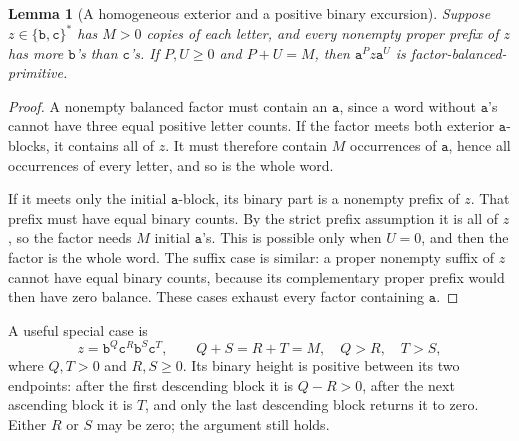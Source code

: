 \documentclass[11pt,letterpaper]{article}
\numberwithin{equation}{section}
\newtheorem{lemma}[theorem]{Lemma}
\theoremstyle{definition}
\theoremstyle{remark}
\renewcommand{\aa}{\mathtt a}
\newcommand{\bb}{\mathtt b}
\newcommand{\cc}{\mathtt c}
\begin{document}
\begin{lemma}[A homogeneous exterior and a positive binary excursion]
\label{lem:primitive}
Suppose \(z\in\{\bb,\cc\}^{*}\) has \(M>0\) copies of each letter,
and every nonempty proper prefix of \(z\) has more \(\bb\)'s than
\(\cc\)'s. If \(P,U\geq0\) and \(P+U=M\), then
\(\aa^Pz\aa^U\) is factor-balanced-primitive.
\end{lemma}
\begin{proof}
A nonempty balanced factor must contain an \(\aa\), since a word
without \(\aa\)'s cannot have three equal positive letter counts.
If the factor meets both exterior \(\aa\)-blocks, it contains all of
\(z\). It must therefore contain \(M\) occurrences of \(\aa\), hence
all occurrences of every letter, and so is the whole word.

If it meets only the initial \(\aa\)-block, its binary part is a
nonempty prefix of \(z\). That prefix must have equal binary counts.
By the strict prefix assumption it is all of \(z\), so the factor
needs \(M\) initial \(\aa\)'s. This is possible only when \(U=0\),
and then the factor is the whole word. The suffix case is similar:
a proper nonempty suffix of \(z\) cannot have equal binary counts,
because its complementary proper prefix would then have zero balance.
These cases exhaust every factor containing \(\aa\).
\end{proof}

A useful special case is
\begin{equation}\label{eq:excursion}
 z=\bb^Q\cc^R\bb^S\cc^T,
 \qquad Q+S=R+T=M,\quad Q>R,\quad T>S,
\end{equation}
where \(Q,T>0\) and \(R,S\geq0\). Its binary height is positive
between its two endpoints: after the first descending block it is
\(Q-R>0\), after the next ascending block it is \(T\), and only the
last descending block returns it to zero. Either \(R\) or \(S\) may
be zero; the argument still holds.
\end{document}
